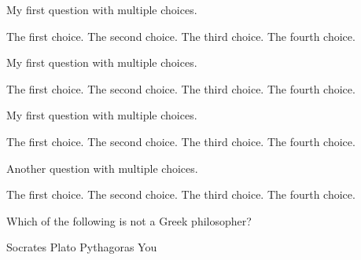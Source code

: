 \documentclass{exam}
\begin{document}
\begin{questions}

\begin{minipage}{\linewidth}
    \question My first question with multiple choices.

    \begin{choices}
      \choice The first choice.
      \choice The second choice.
      \choice The third choice.
      \choice The fourth choice.
    \end{choices}

\end{minipage}

\begin{minipage}{\linewidth}

\question My first question with multiple choices.

  \begin{oneparchoices}
    \choice The first choice.
    \choice The second choice.
    \choice The third choice.
    \choice The fourth choice.
  \end{oneparchoices}

  \end{minipage}

\begin{minipage}{\linewidth}

  \question My first question with multiple choices.
\begin{checkboxes}
    \choice The first choice.
    \choice The second choice.
    \choice The third choice.
    \choice The fourth choice.
\end{checkboxes}
\end{minipage}

\begin{minipage}{\linewidth}

\question Another question with multiple choices.

\begin{oneparcheckboxes}
    \choice The first choice.
    \choice The second choice.
    \choice The third choice.
    \choice The fourth choice.
\end{oneparcheckboxes}

 \checkboxchar{$\Box$}
 \checkedchar{$\blacksquare$}
\end{minipage}

\begin{minipage}{\linewidth}
 \question Which of the following is not a Greek philosopher?

        \begin{oneparcheckboxes}
            \choice Socrates
            \choice Plato
            \choice Pythagoras
            \CorrectChoice You
        \end{oneparcheckboxes}


\end{minipage}
\end{questions}
\end{document}
